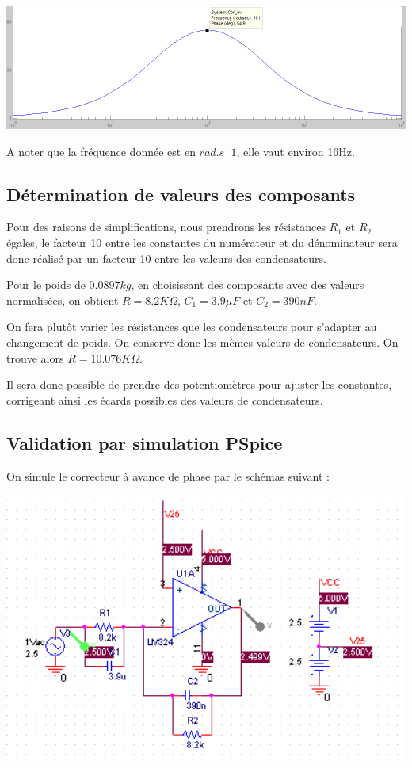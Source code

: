 \documentclass[11pt, french]{article} %
\begin{document}
\begin{center}
\includegraphics[width = 15cm]{SolutionAnalogique/aphmat.png} 
\end{center}

A noter que la fréquence donnée est en $rad.s^-1$, elle vaut environ 16Hz. 
\subsection{Détermination de valeurs des composants}

Pour des raisons de simplifications, nous prendrons les résistances $R_1$ et $R_2$ égales, le facteur 10 entre les constantes du numérateur et du dénominateur sera donc réalisé par un facteur 10 entre les valeurs des condensateurs. 



Pour le poids de $0.0897 kg$, en choisissant des composants avec des valeurs normalisées, on obtient $R=8.2 K\Omega$, $C_1=3.9 \mu F$ et $C_2=390 nF$. 



On fera plutôt varier les résistances que les condensateurs pour s'adapter au changement de poids. On conserve donc les mêmes valeurs de condensateurs. On trouve alors $R=10.076 K\Omega$. 



Il sera donc possible de prendre des potentiomètres pour ajuster les constantes, corrigeant ainsi les écards possibles des valeurs de condensateurs. 


\subsection{Validation par simulation PSpice}

On simule le correcteur à avance de phase par le schémas suivant : 

\begin{center}
\includegraphics[width = 15cm]{SolutionAnalogique/schAvph.png} 
\end{center}
\end{document}
